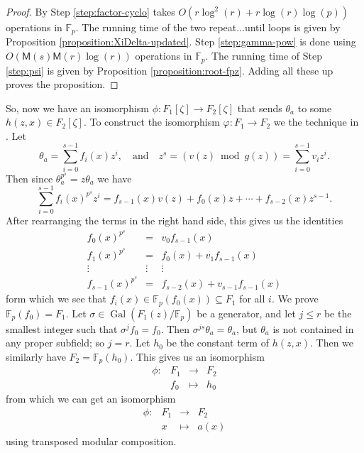 \documentclass[12pt]{article}
\theoremstyle{plain}
\theoremstyle{definition}
\DeclareMathOperator{\gal}{Gal} %
\def\F{\ensuremath{\mathbb{F}}}
\def\MM{\ensuremath{\mathsf{M}}}
\begin{document}
\begin{proof}
	By \cite[Theorem 9]{shoup94} Step \ref{step:factor-cyclo} takes $O(r\log^2(r) + 
	r\log(r)\log(p))$ operations in $\F_p$. The running time of the two repeat...until loops is 
	given by Proposition \ref{proposition:XiDelta-updated}. Step \ref{step:gamma-pow}
	is done using $O(\MM(s)\MM(r)\log(r))$ operations in $\F_p$. The running time of Step 
	\ref{step:psi} is given by Proposition \ref{proposition:root-fpz}. Adding all these up proves 
	the proposition.
\end{proof}
So, now we have an isomorphism $\phi: F_1[\zeta] \rightarrow F_2[\zeta]$ that sends $\theta_a$ to 
some $h(z, x) \in F_2[\zeta]$. To construct the isomorphism $\varphi: F_1 \rightarrow F_2$ we the 
technique in \cite{Allombert02}. Let 
\[ \theta_a = \sum_{i = 0}^{s - 1}f_i(x)z^i, \quad\text{and}\quad z^s = (v(z)  \bmod g(z)) = 
\sum_{i = 0}^{s - 1}v_iz^i. \] 
Then since $\theta_a^{p^s} = z\theta_a$ we have
\[ \sum_{i = 0}^{s - 1}f_i(x)^{p^s}z^i = f_{s - 1}(x)v(z) + f_0(x)z + \cdots + f_{s - 2}(x)z^{s - 
1}.\]
After rearranging the terms in the right hand side, this gives us the identities
\[
\begin{array}{ccc}
	f_0(x)^{p^s} & = & v_0f_{s - 1}(x) \\
	f_1(x)^{p^s} & = & f_0(x) + v_1f_{s - 1}(x) \\
	\vdots & \vdots & \vdots \\
	f_{s - 1}(x)^{p^s} & = & f_{s - 2}(x) + v_{s - 1}f_{s - 1}(x)
\end{array} 
\]
form which we see that $f_i(x) \in \F_p(f_0(x)) \subseteq F_1$ for all $i$. We prove $\F_p(f_0) = 
F_1$. Let $\sigma \in \gal(F_1(z) / \F_p)$ be a generator, and let $j \le r$ be the smallest 
integer such that $\sigma^jf_0 = f_0$. Then $\sigma^{js}\theta_a = \theta_a$, but $\theta_a$ is not 
contained in any proper subfield; so $j = r$. Let $h_0$ be the constant term of $h(z, x)$. Then we 
similarly have $F_2 = \F_p(h_0)$. This gives us an isomorphism
\[
\begin{array}{rlll}
	\phi: & F_1 & \longrightarrow & F_2 \\
	& f_0 & \longmapsto & h_0
\end{array}
\]
from which we can get an isomorphism
\[
\begin{array}{rlll}
	\phi: & F_1 & \longrightarrow & F_2 \\
	& x & \longmapsto & a(x)
\end{array}
\]
using transposed modular composition.
\end{document}
